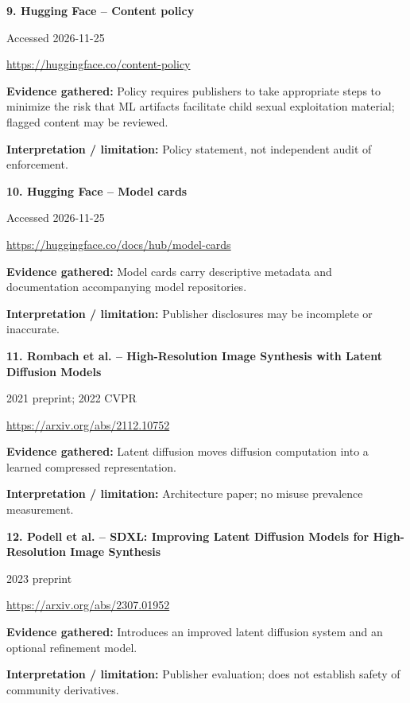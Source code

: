 \documentclass[11pt,a4paper]{article}
\begin{document}
\noindent\begin{minipage}{\linewidth}\textbf{9. Hugging Face -- Content policy}\par{\small Accessed 2026-11-25\par\url{https://huggingface.co/content-policy}}\par
\textbf{Evidence gathered:} Policy requires publishers to take appropriate steps to minimize the risk that ML artifacts facilitate child sexual exploitation material; flagged content may be reviewed.\par\textbf{Interpretation / limitation:} Policy statement, not independent audit of enforcement.\par
\end{minipage}\par\vspace{2mm}
\noindent\begin{minipage}{\linewidth}\textbf{10. Hugging Face -- Model cards}\par{\small Accessed 2026-11-25\par\url{https://huggingface.co/docs/hub/model-cards}}\par
\textbf{Evidence gathered:} Model cards carry descriptive metadata and documentation accompanying model repositories.\par\textbf{Interpretation / limitation:} Publisher disclosures may be incomplete or inaccurate.\par
\end{minipage}\par\vspace{2mm}
\noindent\begin{minipage}{\linewidth}\textbf{11. Rombach et al. -- High-Resolution Image Synthesis with Latent Diffusion Models}\par{\small 2021 preprint; 2022 CVPR\par\url{https://arxiv.org/abs/2112.10752}}\par
\textbf{Evidence gathered:} Latent diffusion moves diffusion computation into a learned compressed representation.\par\textbf{Interpretation / limitation:} Architecture paper; no misuse prevalence measurement.\par
\end{minipage}\par\vspace{2mm}
\noindent\begin{minipage}{\linewidth}\textbf{12. Podell et al. -- SDXL: Improving Latent Diffusion Models for High-Resolution Image Synthesis}\par{\small 2023 preprint\par\url{https://arxiv.org/abs/2307.01952}}\par
\textbf{Evidence gathered:} Introduces an improved latent diffusion system and an optional refinement model.\par\textbf{Interpretation / limitation:} Publisher evaluation; does not establish safety of community derivatives.\par
\end{minipage}\par\vspace{2mm}
\end{document}
